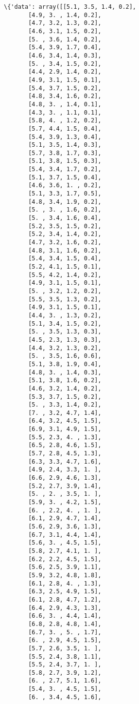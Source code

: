 \documentclass[11pt]{article}
\begin{document}
    \begin{Verbatim}[commandchars=\\\{\}]
\{'data': array([[5.1, 3.5, 1.4, 0.2],
       [4.9, 3. , 1.4, 0.2],
       [4.7, 3.2, 1.3, 0.2],
       [4.6, 3.1, 1.5, 0.2],
       [5. , 3.6, 1.4, 0.2],
       [5.4, 3.9, 1.7, 0.4],
       [4.6, 3.4, 1.4, 0.3],
       [5. , 3.4, 1.5, 0.2],
       [4.4, 2.9, 1.4, 0.2],
       [4.9, 3.1, 1.5, 0.1],
       [5.4, 3.7, 1.5, 0.2],
       [4.8, 3.4, 1.6, 0.2],
       [4.8, 3. , 1.4, 0.1],
       [4.3, 3. , 1.1, 0.1],
       [5.8, 4. , 1.2, 0.2],
       [5.7, 4.4, 1.5, 0.4],
       [5.4, 3.9, 1.3, 0.4],
       [5.1, 3.5, 1.4, 0.3],
       [5.7, 3.8, 1.7, 0.3],
       [5.1, 3.8, 1.5, 0.3],
       [5.4, 3.4, 1.7, 0.2],
       [5.1, 3.7, 1.5, 0.4],
       [4.6, 3.6, 1. , 0.2],
       [5.1, 3.3, 1.7, 0.5],
       [4.8, 3.4, 1.9, 0.2],
       [5. , 3. , 1.6, 0.2],
       [5. , 3.4, 1.6, 0.4],
       [5.2, 3.5, 1.5, 0.2],
       [5.2, 3.4, 1.4, 0.2],
       [4.7, 3.2, 1.6, 0.2],
       [4.8, 3.1, 1.6, 0.2],
       [5.4, 3.4, 1.5, 0.4],
       [5.2, 4.1, 1.5, 0.1],
       [5.5, 4.2, 1.4, 0.2],
       [4.9, 3.1, 1.5, 0.1],
       [5. , 3.2, 1.2, 0.2],
       [5.5, 3.5, 1.3, 0.2],
       [4.9, 3.1, 1.5, 0.1],
       [4.4, 3. , 1.3, 0.2],
       [5.1, 3.4, 1.5, 0.2],
       [5. , 3.5, 1.3, 0.3],
       [4.5, 2.3, 1.3, 0.3],
       [4.4, 3.2, 1.3, 0.2],
       [5. , 3.5, 1.6, 0.6],
       [5.1, 3.8, 1.9, 0.4],
       [4.8, 3. , 1.4, 0.3],
       [5.1, 3.8, 1.6, 0.2],
       [4.6, 3.2, 1.4, 0.2],
       [5.3, 3.7, 1.5, 0.2],
       [5. , 3.3, 1.4, 0.2],
       [7. , 3.2, 4.7, 1.4],
       [6.4, 3.2, 4.5, 1.5],
       [6.9, 3.1, 4.9, 1.5],
       [5.5, 2.3, 4. , 1.3],
       [6.5, 2.8, 4.6, 1.5],
       [5.7, 2.8, 4.5, 1.3],
       [6.3, 3.3, 4.7, 1.6],
       [4.9, 2.4, 3.3, 1. ],
       [6.6, 2.9, 4.6, 1.3],
       [5.2, 2.7, 3.9, 1.4],
       [5. , 2. , 3.5, 1. ],
       [5.9, 3. , 4.2, 1.5],
       [6. , 2.2, 4. , 1. ],
       [6.1, 2.9, 4.7, 1.4],
       [5.6, 2.9, 3.6, 1.3],
       [6.7, 3.1, 4.4, 1.4],
       [5.6, 3. , 4.5, 1.5],
       [5.8, 2.7, 4.1, 1. ],
       [6.2, 2.2, 4.5, 1.5],
       [5.6, 2.5, 3.9, 1.1],
       [5.9, 3.2, 4.8, 1.8],
       [6.1, 2.8, 4. , 1.3],
       [6.3, 2.5, 4.9, 1.5],
       [6.1, 2.8, 4.7, 1.2],
       [6.4, 2.9, 4.3, 1.3],
       [6.6, 3. , 4.4, 1.4],
       [6.8, 2.8, 4.8, 1.4],
       [6.7, 3. , 5. , 1.7],
       [6. , 2.9, 4.5, 1.5],
       [5.7, 2.6, 3.5, 1. ],
       [5.5, 2.4, 3.8, 1.1],
       [5.5, 2.4, 3.7, 1. ],
       [5.8, 2.7, 3.9, 1.2],
       [6. , 2.7, 5.1, 1.6],
       [5.4, 3. , 4.5, 1.5],
       [6. , 3.4, 4.5, 1.6],

\end{Verbatim}
\end{document}
